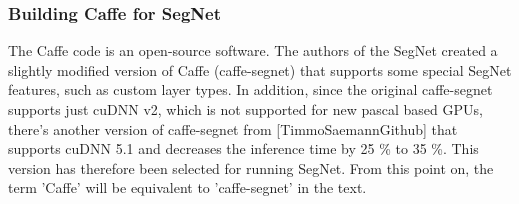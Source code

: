\subsubsection{Building Caffe for SegNet} 

The Caffe code is an open-source software. The authors of the SegNet created a slightly modified version of Caffe (caffe-segnet) that supports some special SegNet features, such as custom layer types. In addition, since the original caffe-segnet supports just cuDNN v2, which is not supported for new pascal based GPUs, there's another version of caffe-segnet from [TimmoSaemannGithub] that supports cuDNN 5.1 and decreases the inference time by 25 \% to 35 \%. This version has therefore been selected for running SegNet. From this point on, the term 'Caffe' will be equivalent to 'caffe-segnet' in the text.


